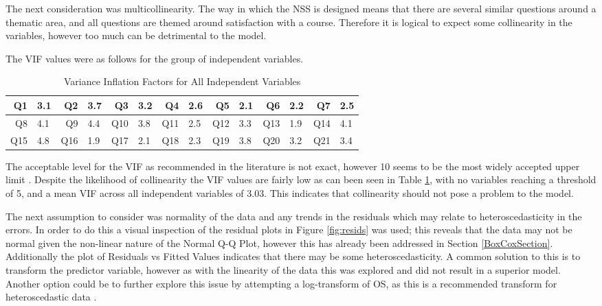 \documentclass[11pt,a4paper]{report}
\begin{document}
The next consideration was multicollinearity. The way in which the NSS is designed means that there are several similar questions around a thematic area, and all questions are themed around satisfaction with a course. Therefore it is logical to expect some collinearity in the variables, however too much can be detrimental to the model. 

The \ac{VIF} values were as follows for the group of independent variables. 

\begin{table}[H]
	\caption{Variance Inflation Factors for All Independent Variables}
	\centering
	\begin{tabular}{|rl|rl|rl|rl|rl|rl|rl|}
	\hline        
	Q1 & 3.1 & Q2 & 3.7 & Q3 & 3.2 & Q4 & 2.6 & Q5 & 2.1 & Q6 & 2.2 & Q7 & 2.5 \\
	\hline
	Q8 & 4.1 & Q9 & 4.4 & Q10 & 3.8 & Q11 & 2.5 & Q12 & 3.3 & Q13 & 1.9 & Q14 & 4.1 \\
	\hline
	Q15 & 4.8 & Q16 & 1.9 & Q17 & 2.1 & Q18 & 2.3 & Q19 & 3.8 & Q20 & 3.2 & Q21 & 3.4\\
	\hline
	\end{tabular}

	\label{table:VIF}
\end{table}

The acceptable level for the VIF as recommended in the literature is not exact, however 10 seems to be the most widely accepted upper limit \cite{o2007caution}. Despite the likelihood of collinearity the VIF values are fairly low as can been seen in Table \ref{table:VIF}, with no variables reaching a threshold of 5, and a mean VIF across all independent variables of 3.03. This indicates that collinearity should not pose a problem to the model.

The next assumption to consider was normality of the data and any trends in the residuals which may relate to heteroscedasticity in the errors. In order to do this a visual inspection of the residual plots in Figure \ref{fig:resids} was used; this reveals that the data may not be normal given the non-linear nature of the Normal Q-Q Plot, however this has already been addressed in Section \ref{BoxCoxSection}. Additionally the plot of Residuals vs Fitted Values indicates that there may be some heteroscedasticity. A common solution to this is to transform the predictor variable, however as with the linearity of the data this was explored and did not result in a superior model. Another option could be to further explore this issue by attempting a log-transform of OS, as this is a recommended transform for heteroscedastic data \cite{zumel2014practical}.
\end{document}
